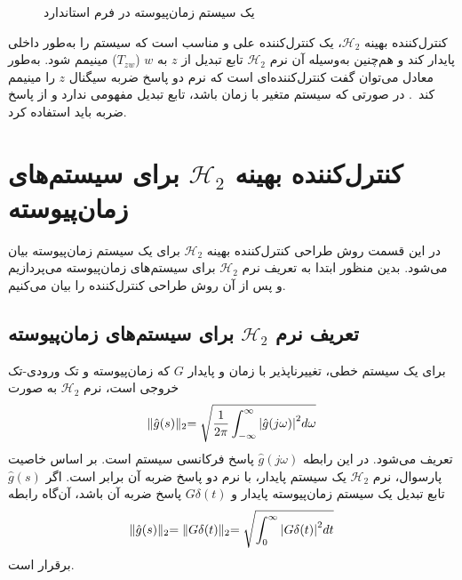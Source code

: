 \setlength{\unitlength}{1cm}
\begin{figure}[b]
\centering
{}
\caption{یک سیستم زمان‌پیوسته در فرم استاندارد}
\label{pic2-2}
\end{figure} 


کنترل‌کننده بهینه $\mathcal{H}_2$، یک کنترل‌کننده علی و مناسب است که سیستم را به‌طور داخلی پایدار کند و هم‌چنین به‌وسیله آن نرم $\mathcal{H}_2$ تابع تبدیل از  $z$ به $w$ ($T_{zw}$) مینیمم شود. به‌طور معادل می‌توان گفت کنترل‌کننده‌ای است که نرم دو پاسخ ضربه سیگنال  $z$ را مینیمم کند~\cite{paper_4}. در صورتی که سیستم متغیر با زمان باشد، تابع تبدیل مفهومی ندارد و از پاسخ ضربه باید استفاده کرد.  

\section{کنترل‌کننده بهینه $\mathcal{H}_2$ برای سیستم‌های زمان‌پیوسته}
در این قسمت روش طراحی کنترل‌کننده بهینه $\mathcal{H}_2$ برای یک سیستم زمان‌پیوسته بیان می‌شود. بدین منظور ابتدا به تعریف نرم $\mathcal{H}_2$ برای سیستم‌های زمان‌پیوسته می‌پردازیم و پس از آن روش طراحی کنترل‌کننده را بیان می‌کنیم.
\subsection{تعریف نرم $\mathcal{H}_2$ برای سیستم‌های زمان‌پیوسته} 
برای یک سیستم خطی، تغییرناپذیر با زمان و پایدار $G$ که زمان‌پیوسته و تک ورودی-تک خروجی است، نرم $\mathcal{H}_2$ به صورت 
\begin{equation}
\lVert\hat{g}(s)\lVert_{2}=\sqrt{\dfrac{1}{2\pi}\int_{-\infty}^{\infty}{{\vert \hat{g}(j\omega)\vert}^2}d\omega} 
\label{eq2-1}
\end{equation}
تعریف می‌شود. در این رابطه $\hat{g}(j\omega) $ پاسخ فرکانسی سیستم است. بر اساس خاصیت پارسوال،  نرم $\mathcal{H}_2$ یک سیستم پایدار، با نرم دو پاسخ ضربه آن برابر است. 
اگر 
$\hat{g}(s)$
تابع تبدیل یک سیستم زمان‌پیوسته پایدار و
$G\delta(t)$
پاسخ ضربه آن باشد، آن‌گاه رابطه
\begin{equation}
\lVert\hat{g}(s)\lVert_{2}=\lVert G\delta(t)\lVert_{2} = \sqrt{\int_{0}^{\infty}{{\vert G\delta(t)\vert}^2}d t} 
\label{eq2-2}
\end{equation}
برقرار است.

